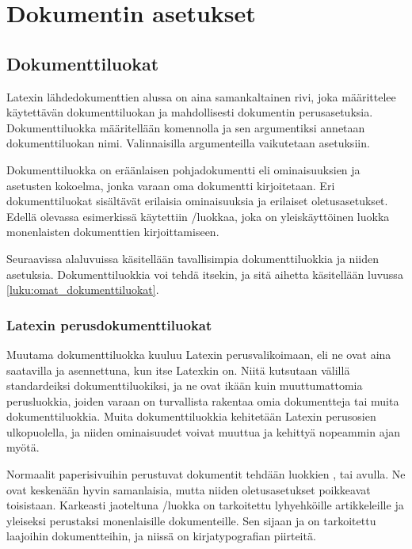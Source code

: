 \chapter{Dokumentin asetukset}


\section{Dokumenttiluokat}
\label{luku:dokumenttiluokat}

Latexin lähdedokumenttien alussa on aina samankaltainen rivi, joka
määrittelee käytettävän dokumenttiluokan ja mahdollisesti dokumentin
pe\-rus\-ase\-tuk\-sia. Dokumenttiluokka määritellään komennolla
 ja sen argumentiksi annetaan
dokumenttiluokan nimi. Valinnaisilla argumenteilla vaikutetaan
asetuksiin.


Dokumenttiluokka on eräänlaisen pohjadokumentti eli ominaisuuksien ja
asetusten kokoelma, jonka varaan oma dokumentti kirjoitetaan. Eri
dokumenttiluokat sisältävät erilaisia ominaisuuksia ja erilaiset
oletusasetukset. Edellä olevassa esimerkissä käytettiin
\-/luokkaa, joka on yleiskäyttöinen luokka
monenlaisten dokumenttien kirjoittamiseen.

Seuraavissa alaluvuissa käsitellään tavallisimpia dokumenttiluokkia ja
niiden asetuksia. Dokumenttiluokkia voi tehdä itsekin, ja sitä aihetta
käsitellään luvussa \ref{luku:omat_dokumenttiluokat}.

\subsection{Latexin perusdokumenttiluokat}

Muutama dokumenttiluokka kuuluu Latexin perusvalikoimaan, eli ne ovat
aina saatavilla ja asennettuna, kun itse Latexkin on. Niitä kutsutaan
välillä standardeiksi dokumenttiluokiksi, ja ne ovat ikään kuin
muuttumattomia perusluokkia, joiden varaan on turvallista rakentaa omia
dokumentteja tai muita dokumenttiluokkia. Muita dokumenttiluokkia
kehitetään Latexin perusosien ulkopuolella, ja niiden ominaisuudet
voivat muuttua ja kehittyä nopeammin ajan myötä.

Normaalit%
 paperisivuihin perustuvat
dokumentit tehdään luokkien ,  tai
 avulla. Ne ovat keskenään hyvin samanlaisia, mutta
niiden oletusasetukset poikkeavat toisistaan. Karkeasti jaoteltuna
\-/luokka on tarkoitettu lyhyehköille artikkeleille ja
yleiseksi perustaksi monenlaisille dokumenteille. Sen sijaan
 ja  on tarkoitettu laajoihin
dokumentteihin, ja niissä on kirja\-typo\-grafian piirteitä.

